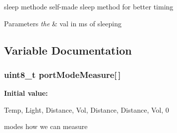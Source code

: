 sleep methode self-\/made sleep method for better timing 


\begin{DoxyParams}{\-Parameters}
{\em the} & val in ms of sleeping \\
\hline
\end{DoxyParams}


\subsection{\-Variable \-Documentation}
\subsubsection[{port\-Mode\-Measure}]{\setlength{\rightskip}{0pt plus 5cm}uint8\-\_\-t {\bf port\-Mode\-Measure}[$\,$]}\label{group__main_gac9e26f1cb437a223b2c28901d6e4df8b}
{\bfseries \-Initial value\-:}
\begin{DoxyCode}
 {Temp, 
                Light,
                Distance,
                Vol,
                Distance,
                Distance,
                Vol,
                0}
\end{DoxyCode}


modes how we can measure 

